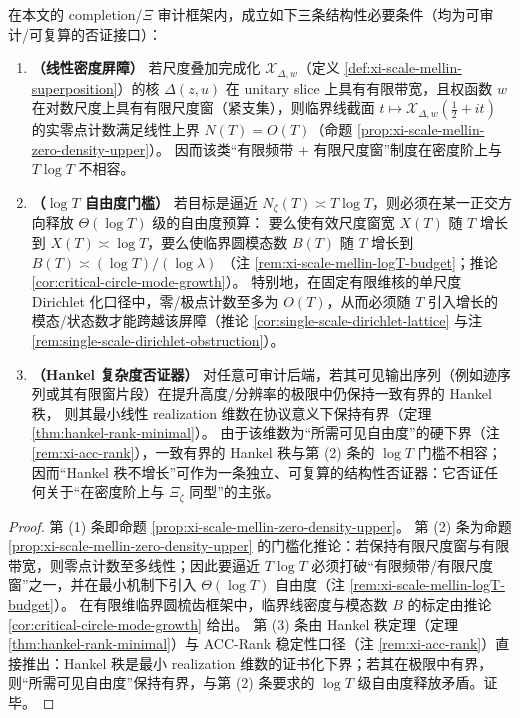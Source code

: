 \begin{theorem}\label{thm:xi-zero-statistics-log-budget-lower-bound}
在本文的 completion/\(\Xi\) 审计框架内，成立如下三条结构性必要条件（均为可审计/可复算的否证接口）：
\begin{enumerate}
  \item \textbf{（线性密度屏障）}
  若尺度叠加完成化 \(\mathcal X_{\Delta,w}\)（定义 \ref{def:xi-scale-mellin-superposition}）的核 \(\Delta(z,u)\) 在 unitary slice 上具有有限带宽，且权函数 \(w\) 在对数尺度上具有有限尺度窗（紧支集），则临界线截面
  \(t\mapsto \mathcal X_{\Delta,w}(\tfrac12+it)\)
  的实零点计数满足线性上界 \(N(T)=O(T)\)（命题 \ref{prop:xi-scale-mellin-zero-density-upper}）。
  因而该类“有限频带 + 有限尺度窗”制度在密度阶上与 \(T\log T\) 不相容。

  \item \textbf{（\(\log T\) 自由度门槛）}
  若目标是逼近 \(N_\zeta(T)\asymp T\log T\)，则必须在某一正交方向释放 \(\Theta(\log T)\) 级的自由度预算：
  要么使有效尺度窗宽 \(X(T)\) 随 \(T\) 增长到 \(X(T)\asymp \log T\)，要么使临界圆模态数 \(B(T)\) 随 \(T\) 增长到 \(B(T)\asymp (\log T)/(\log\lambda)\)
  （注 \ref{rem:xi-scale-mellin-logT-budget}；推论 \ref{cor:critical-circle-mode-growth}）。
  特别地，在固定有限维核的单尺度 Dirichlet 化口径中，零/极点计数至多为 \(O(T)\)，从而必须随 \(T\) 引入增长的模态/状态数才能跨越该屏障（推论 \ref{cor:single-scale-dirichlet-lattice} 与注 \ref{rem:single-scale-dirichlet-obstruction}）。

  \item \textbf{（Hankel 复杂度否证器）}
  对任意可审计后端，若其可见输出序列（例如迹序列或其有限窗片段）在提升高度/分辨率的极限中仍保持一致有界的 Hankel 秩，
  则其最小线性 realization 维数在协议意义下保持有界（定理 \ref{thm:hankel-rank-minimal}）。
  由于该维数为“所需可见自由度”的硬下界（注 \ref{rem:xi-acc-rank}），一致有界的 Hankel 秩与第 (2) 条的 \(\log T\) 门槛不相容；
  因而“Hankel 秩不增长”可作为一条独立、可复算的结构性否证器：它否证任何关于“在密度阶上与 \(\Xi_\zeta\) 同型”的主张。
\end{enumerate}
\end{theorem}

\begin{proof}
第 (1) 条即命题 \ref{prop:xi-scale-mellin-zero-density-upper}。
第 (2) 条为命题 \ref{prop:xi-scale-mellin-zero-density-upper} 的门槛化推论：若保持有限尺度窗与有限带宽，则零点计数至多线性；因此要逼近 \(T\log T\) 必须打破“有限频带/有限尺度窗”之一，并在最小机制下引入 \(\Theta(\log T)\) 自由度（注 \ref{rem:xi-scale-mellin-logT-budget}）。
在有限维临界圆梳齿框架中，临界线密度与模态数 \(B\) 的标定由推论 \ref{cor:critical-circle-mode-growth} 给出。
第 (3) 条由 Hankel 秩定理（定理 \ref{thm:hankel-rank-minimal}）与 ACC-Rank 稳定性口径（注 \ref{rem:xi-acc-rank}）直接推出：Hankel 秩是最小 realization 维数的证书化下界；若其在极限中有界，则“所需可见自由度”保持有界，与第 (2) 条要求的 \(\log T\) 级自由度释放矛盾。证毕。
\end{proof}


